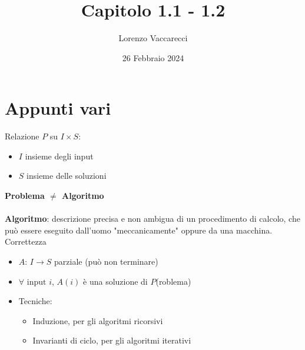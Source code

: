 \documentclass[12pt]{article}
\title{Capitolo 1.1 - 1.2}
\author{Lorenzo Vaccarecci}
\date{26 Febbraio 2024}
\begin{document}
\maketitle
\section{Appunti vari}
Relazione \(P\) su \(I\times S\):
\begin{itemize}
    \setlength\itemsep{0em} 
    \item \(I\) insieme degli input
    \item \(S\) insieme delle soluzioni
\end{itemize}
\textbf{Problema \(\neq\) Algoritmo}
\\\\\textbf{Algoritmo}: descrizione precisa e non ambigua di un procedimento di calcolo, che può essere eseguito dall'uomo "meccanicamente" oppure da una macchina.
\\ Correttezza
\begin{itemize}
    \setlength\itemsep{0em}
    \item \(A\): \(I\rightarrow S\) parziale (può non terminare)
    \item \(\forall \text{ input } i\), \(A(i)\) è una soluzione di \(P\)(roblema)
    \item Tecniche:
    \begin{itemize}
        \item Induzione, per gli algoritmi ricorsivi
        \item Invarianti di ciclo, per gli algoritmi iterativi
    \end{itemize}
\end{itemize}
\end{document}

